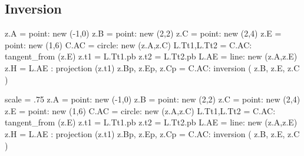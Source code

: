 \hspace*{\fill}
\hspace*{\fill}

\subsection{Inversion} %
\label{sub:inversion}

\begin{tkzexample}[latex=0cm,small,code only]
 \begin{tkzelements}
   z.A         = point: new (-1,0)
   z.B         = point: new (2,2)
   z.C         = point: new (2,4)
   z.E         = point: new (1,6)
   C.AC        = circle:    new (z.A,z.C)
   L.Tt1,L.Tt2 = C.AC: tangent_from (z.E)
   z.t1        = L.Tt1.pb
   z.t2        = L.Tt2.pb
   L.AE        = line: new (z.A,z.E)
   z.H         = L.AE : projection (z.t1)
   z.Bp,
   z.Ep,
   z.Cp        = C.AC: inversion ( z.B, z.E, z.C )
\end{tkzelements}

\end{tkzexample}

\begin{tkzelements}
scale = .75
z.A     = point: new (-1,0)
z.B     = point: new (2,2)
z.C     = point: new (2,4)
z.E     = point: new (1,6)
C.AC    = circle:    new (z.A,z.C)
L.Tt1,L.Tt2 = C.AC: tangent_from (z.E)
z.t1    = L.Tt1.pb
z.t2    = L.Tt2.pb
L.AE    = line: new (z.A,z.E)
z.H     = L.AE : projection (z.t1)
z.Bp,
z.Ep,
z.Cp    = C.AC: inversion ( z.B, z.E, z.C )
\end{tkzelements}

\hspace*{\fill}
\hspace*{\fill}


